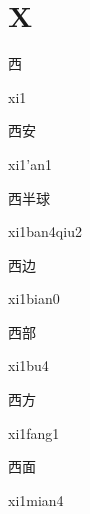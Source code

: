 ﻿%
\section*{X}

\begin{verbete}[xi1]{西}
\begin{pronuncia}{xi1}
\end{pronuncia}
\end{verbete}

\begin{verbete}[xi1'an1]{西安}
\begin{pronuncia}{xi1'an1}
\end{pronuncia}
\end{verbete}

\begin{verbete}{西半球}
\begin{pronuncia}{xi1ban4qiu2}
\end{pronuncia}
\end{verbete}

\begin{verbete}[xi1bian0]{西边}
\begin{pronuncia}{xi1bian0}
\end{pronuncia}
\end{verbete}

\begin{verbete}[xi1bu4]{西部}
\begin{pronuncia}{xi1bu4}
\end{pronuncia}
\end{verbete}

\begin{verbete}[xi1fang1]{西方}
\begin{pronuncia}{xi1fang1}
\end{pronuncia}
\end{verbete}

\begin{verbete}[xi1mian4]{西面}
\begin{pronuncia}{xi1mian4}
\end{pronuncia}
\end{verbete}

